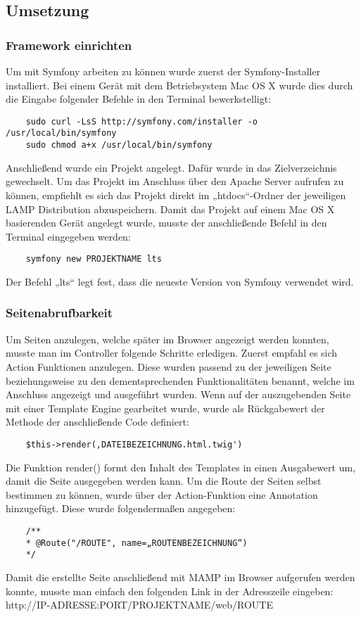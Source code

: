   \subsection{Umsetzung}

    \subsubsection{Framework einrichten}

	Um mit Symfony arbeiten zu können wurde zuerst der Symfony-Installer installiert. Bei einem Gerät mit dem Betriebsystem Mac OS X wurde dies durch die Eingabe folgender Befehle in den Terminal bewerkstelligt:
	\lstset{language = bash}
  	\begin{lstlisting}
	sudo curl -LsS http://symfony.com/installer -o /usr/local/bin/symfony
	sudo chmod a+x /usr/local/bin/symfony
  	\end{lstlisting}

	Anschließend wurde ein Projekt angelegt. Dafür wurde in das Zielverzeichnis gewechselt. Um das Projekt im Anschluss über den Apache Server aufrufen zu können, empfiehlt es sich das Projekt direkt im „htdocs“-Ordner der jeweiligen LAMP Distribution abzuspeichern. Damit das Projekt auf einem Mac OS X basierenden Gerät angelegt wurde, musste der anschließende Befehl in den Terminal eingegeben werden:
	\lstset{language = bash}
  	\begin{lstlisting}
	symfony new PROJEKTNAME lts
  	\end{lstlisting}
	Der Befehl „lts“ legt fest, dass die neueste Version von Symfony verwendet wird.

    \subsubsection{Seitenabrufbarkeit}

	Um Seiten anzulegen, welche später im Browser angezeigt werden konnten, musste man im Controller folgende Schritte erledigen. Zuerst empfahl es sich Action Funktionen anzulegen. Diese wurden passend zu der jeweiligen Seite beziehungsweise zu den dementsprechenden Funktionalitäten benannt, welche im Anschluss angezeigt und ausgeführt wurden. Wenn auf der auszugebenden Seite mit einer Template Engine gearbeitet wurde, wurde als Rückgabewert der Methode der anschließende Code definiert:
	\lstset{language = php}
  	\begin{lstlisting}
	$this->render(‚DATEIBEZEICHNUNG.html.twig')
  	\end{lstlisting}
	Die Funktion render() formt den Inhalt des Templates in einen Ausgabewert um, damit die Seite  ausgegeben werden kann.
	Um die Route der Seiten selbst bestimmen zu können, wurde über der Action-Funktion eine Annotation hinzugefügt. Diese wurde folgendermaßen angegeben:
	\lstset{language = php}
  	\begin{lstlisting}
	/**
	* @Route("/ROUTE", name=„ROUTENBEZEICHNUNG“)
	*/
  	\end{lstlisting}
	Damit die erstellte Seite anschließend mit MAMP im Browser aufgerufen werden konnte, musste man einfach den folgenden Link in der Adresszeile eingeben:
	http://IP-ADRESSE:PORT/PROJEKTNAME/web/ROUTE


